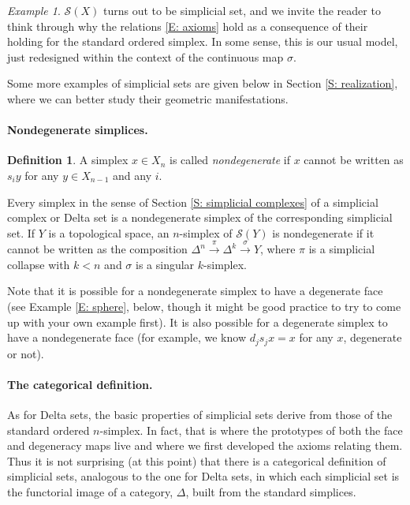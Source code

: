 \documentclass[12pt]{article}
\theoremstyle{plain}
\theoremstyle{definition}
\newtheorem{definition}[theorem]{Definition}
\theoremstyle{remark}
\newtheorem{example}[theorem]{Example}
\newcommand{\ms}[1]{\mathscr{#1}}
\begin{document}
\begin{example}
$\ms S(X)$ turns out to be simplicial set, and we invite the reader to think through why the relations \eqref{E: axioms} hold as a consequence of their holding for  the standard ordered simplex. 
In some sense, this is our usual model, just redesigned within the context of the continuous map $\sigma$.  
\end{example}


Some more examples of simplicial sets are given below in Section \ref{S: realization}, where we can better study their geometric manifestations.



\paragraph{Nondegenerate simplices.}

\begin{definition}
A simplex $x\in X_n$ is called \emph{nondegenerate} if $x$ cannot be written as $s_iy$ for any $y\in X_{n-1}$ and any $i$.
\end{definition}

Every simplex in the sense of Section \ref{S: simplicial complexes} of a simplicial complex or Delta set  is a nondegenerate simplex
of the corresponding simplicial set.  If $Y$ is a topological space, an $n$-simplex of $\ms S(Y)$ is nondegenerate if it cannot be written as the composition $\Delta^n\overset{\pi}{\to} \Delta^k\overset{\sigma}{\to} Y$, where $\pi$ is a simplicial collapse with $k<n$ and $\sigma$ is a singular $k$-simplex.

Note that it is possible for a nondegenerate simplex to have a degenerate face (see Example \ref{E: sphere}, below, though it might be good practice to try to come up with your own example first).  It is also possible  for a degenerate simplex to have a nondegenerate face (for example, we know $d_js_jx=x$ for any $x$, degenerate or not).


\paragraph{The categorical definition.} As for Delta sets, the basic properties of simplicial sets derive from those of the standard ordered $n$-simplex. In fact, that is where the prototypes of both the face and degeneracy maps live and where we first developed the axioms relating them. Thus it is not surprising (at this point) that there is a categorical definition of simplicial sets, analogous to the one for Delta sets, in which each simplicial set is the functorial image of a category, $\Delta$, built from the standard simplices. 
\end{document}
